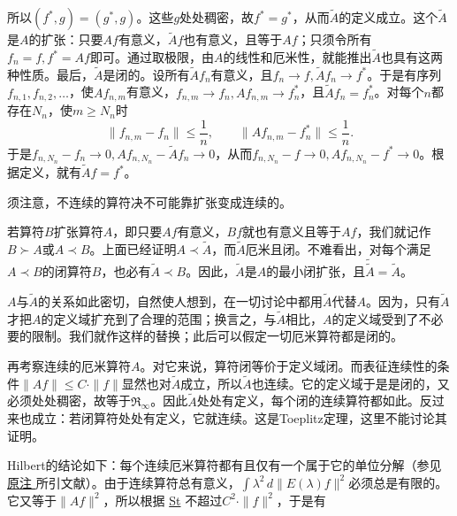 \documentclass[fontsize=13pt,twoside,openany,headings=normal,parskip=false,bookmarkpackage=false,DIV=calc]{scrbook}
\begin{document}
\hypertarget{origpage-77}{}\label{origpage-77}所以$(f^*,\allowbreak g)=(g^*,\allowbreak g)$。这些$g$处处稠密，故$f^*=g^*$，从而$\widetilde A$的定义成立。这个$\widetilde A$是$A$的扩张：只要$Af$有意义，$\widetilde Af$也有意义，且等于$Af$；只须令所有$f_n=f,\allowbreak f^*=Af$即可。通过取极限，由$A$的线性和厄米性，就能推出$\widetilde A$也具有这两种性质。最后，$\widetilde A$是闭的。设所有$\widetilde Af_n$有意义，且$f_n\to f,\allowbreak \widetilde Af_n\to f^*$。于是有序列$f_{n,\allowbreak 1},\allowbreak f_{n,\allowbreak 2},\allowbreak \ldots$，使$Af_{n,\allowbreak m}$有意义，$f_{n,\allowbreak m}\to f_n,\allowbreak Af_{n,\allowbreak m}\to f_n^*$，且$\widetilde Af_n=f_n^*$。对每个$n$都存在$N_n$，使$m\geq N_n$时
\[
\|f_{n,m}-f_n\|\leq\frac1n,\qquad\|Af_{n,m}-f_n^*\|\leq\frac1n.
\]
于是$f_{n,\allowbreak N_n}-f_n\to0,\allowbreak Af_{n,\allowbreak N_n}-\widetilde Af_n\to0$，从而$f_{n,\allowbreak N_n}-f\to0,\allowbreak Af_{n,\allowbreak N_n}-f^*\to0$。根据定义，就有$\widetilde Af=f^*$。

须注意，不连续的算符决不可能靠扩张变成连续的。

若算符$B$扩张算符$A$，即只要$Af$有意义，$Bf$就也有意义且等于$Af$，我们就记作$B\succ A$或$A\prec B$。上面已经证明$A\prec\widetilde A$，而$\widetilde A$厄米且闭。不难看出，对每个满足$A\prec B$的闭算符$B$，也必有$\widetilde A\prec B$。因此，$\widetilde A$是$A$的最小闭扩张，且$\widetilde{\widetilde A}=\widetilde A$。

$A$与$\widetilde A$的关系如此密切，自然使人想到，在一切讨论中都用$\widetilde A$代替$A$。因为，只有$\widetilde A$才把$A$的定义域扩充到了合理的范围；换言之，与$\widetilde A$相比，$A$的定义域受到了不必要的限制。我们就作这样的替换；此后可以假定一切厄米算符都是闭的。

再考察连续的厄米算符$A$。对它来说，算符闭等价于定义域闭。而表征连续性的条件$\|Af\|\leq C\cdot\|f\|$显然也对$\widetilde A$成立，所以$\widetilde A$也连续。它的定义域于是是闭的，又必须处处稠密，故等于$\mathfrak{R}_\infty$。因此$\widetilde A$处处有定义，每个闭的连续算符都如此。反过来也成立：若闭算符处处有定义，它就连续。这是Toeplitz定理，这里不能讨论其证明。

Hilbert的结论如下：每个连续厄米算符都有且仅有一个属于它的单位分解（参见\CJKglue \hyperlink{note-70}{原注 } 所引文献）。由于连续算符总有意义，$\int\lambda^2\,d\|E(\lambda)f\|^2$必须总是有限的。它又等于$\|Af\|^2$，所以根据 \hyperref[eq:II.9.St]{St} 不超过$C^2\cdot\|f\|^2$，于是有
\end{document}
